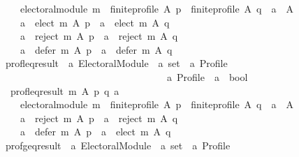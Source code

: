 \begin{isabellebody}
\ \ \ \ electoral{\isacharunderscore}{\kern0pt}module\ m\ {\isasymand}\ finite{\isacharunderscore}{\kern0pt}profile\ A\ p\ {\isasymand}\ finite{\isacharunderscore}{\kern0pt}profile\ A\ q\ {\isasymand}\ a\ {\isasymin}\ A\ {\isasymand}\isanewline
\ \ \ \ {\isacharparenleft}{\kern0pt}a\ {\isasymin}\ elect\ m\ A\ p\ {\isasymlongrightarrow}\ a\ {\isasymin}\ elect\ m\ A\ q{\isacharparenright}{\kern0pt}\ {\isasymand}\isanewline
\ \ \ \ {\isacharparenleft}{\kern0pt}a\ {\isasymin}\ reject\ m\ A\ p\ {\isasymlongrightarrow}\ a\ {\isasymin}\ reject\ m\ A\ q{\isacharparenright}{\kern0pt}\ {\isasymand}\isanewline
\ \ \ \ {\isacharparenleft}{\kern0pt}a\ {\isasymin}\ defer\ m\ A\ p\ {\isasymlongrightarrow}\ a\ {\isasymin}\ defer\ m\ A\ q{\isacharparenright}{\kern0pt}{\isachardoublequoteclose}\isanewline
\isanewline
{}\isamarkupfalse%
\ prof{\isacharunderscore}{\kern0pt}leq{\isacharunderscore}{\kern0pt}result\ {\isacharcolon}{\kern0pt}{\isacharcolon}{\kern0pt}\ {\isachardoublequoteopen}{\isacharprime}{\kern0pt}a\ Electoral{\isacharunderscore}{\kern0pt}Module\ {\isasymRightarrow}\ {\isacharprime}{\kern0pt}a\ set\ {\isasymRightarrow}\ {\isacharprime}{\kern0pt}a\ Profile\ {\isasymRightarrow}\isanewline
\ \ \ \ \ \ \ \ \ \ \ \ \ \ \ \ \ \ \ \ \ \ \ \ \ \ \ \ \ \ \ \ \ \ {\isacharprime}{\kern0pt}a\ Profile\ {\isasymRightarrow}\ {\isacharprime}{\kern0pt}a\ {\isasymRightarrow}\ bool{\isachardoublequoteclose}\ \isanewline
\ \ {\isachardoublequoteopen}prof{\isacharunderscore}{\kern0pt}leq{\isacharunderscore}{\kern0pt}result\ m\ A\ p\ q\ a\ {\isasymequiv}\isanewline
\ \ \ \ electoral{\isacharunderscore}{\kern0pt}module\ m\ {\isasymand}\ finite{\isacharunderscore}{\kern0pt}profile\ A\ p\ {\isasymand}\ finite{\isacharunderscore}{\kern0pt}profile\ A\ q\ {\isasymand}\ a\ {\isasymin}\ A\ {\isasymand}\isanewline
\ \ \ \ {\isacharparenleft}{\kern0pt}a\ {\isasymin}\ reject\ m\ A\ p\ {\isasymlongrightarrow}\ a\ {\isasymin}\ reject\ m\ A\ q{\isacharparenright}{\kern0pt}\ {\isasymand}\isanewline
\ \ \ \ {\isacharparenleft}{\kern0pt}a\ {\isasymin}\ defer\ m\ A\ p\ {\isasymlongrightarrow}\ a\ {\isasymnotin}\ elect\ m\ A\ q{\isacharparenright}{\kern0pt}{\isachardoublequoteclose}\isanewline
\isanewline
{}\isamarkupfalse%
\ prof{\isacharunderscore}{\kern0pt}geq{\isacharunderscore}{\kern0pt}result\ {\isacharcolon}{\kern0pt}{\isacharcolon}{\kern0pt}\ {\isachardoublequoteopen}{\isacharprime}{\kern0pt}a\ Electoral{\isacharunderscore}{\kern0pt}Module\ {\isasymRightarrow}\ {\isacharprime}{\kern0pt}a\ set\ {\isasymRightarrow}\ {\isacharprime}{\kern0pt}a\ Profile\ {\isasymRightarrow}\isanewline

\end{isabellebody}
